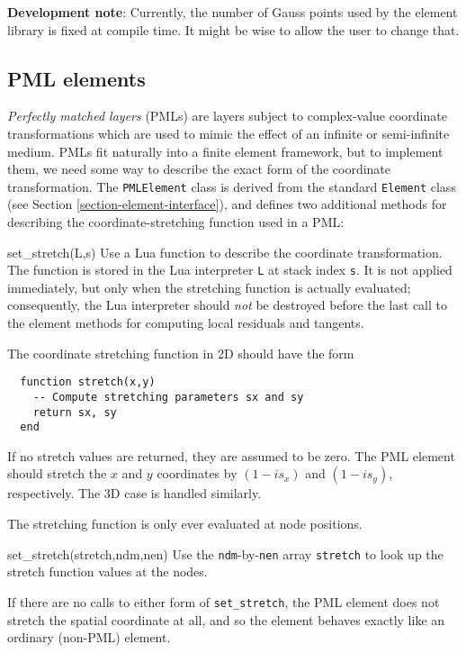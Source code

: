 \documentclass{article}
\newcommand{\devnote}[1]{%
  \begin{trivlist}
  \item\textbf{Development note}: #1
  \end{trivlist}}
\newenvironment{codelist}[1][\quad]%
  {\begin{list}{}{%
   \settowidth{\labelwidth}{\texttt{#1}\hfil}%
   \setlength{\leftmargin}{\labelwidth}%
   \addtolength{\leftmargin}{\labelsep}%
   \addtolength{\leftmargin}{\parindent}%
   \renewcommand{\makelabel}[1]{\texttt{##1}}}}%
  {\end{list}}
\newcommand{\ttt}[1]{\texttt{#1}}
\begin{document}
\devnote{Currently, the number of Gauss points used by the element
  library is fixed at compile time.  It might be wise to allow the
  user to change that.}


\subsection{PML elements}

\emph{Perfectly matched layers} (PMLs) are layers subject to
complex-value coordinate transformations which are used to mimic the
effect of an infinite or semi-infinite medium.  PMLs fit naturally
into a finite element framework, but to implement them, we need some
way to describe the exact form of the coordinate transformation.
The \ttt{PMLElement} class is derived from the standard
\ttt{Element} class (see Section
\ref{section-element-interface}), and defines two additional methods
for describing the coordinate-stretching function used in a PML:
\begin{codelist}

  \item[set\_stretch(L,s)]
    Use a Lua function to describe the coordinate transformation.  The
    function is stored in the Lua interpreter \ttt{L} at stack
    index \ttt{s}.  It is not applied immediately, but only when
    the stretching function is actually evaluated; consequently, the
    Lua interpreter should \emph{not} be destroyed before the last
    call to the element methods for computing local residuals and
    tangents.

    The coordinate stretching function in 2D should have the form
    \begin{verbatim}
  function stretch(x,y)
    -- Compute stretching parameters sx and sy
    return sx, sy
  end
    \end{verbatim}
    If no stretch values are returned, they are assumed to be zero.
    The PML element should stretch the $x$ and $y$ coordinates by
    $(1-is_x)$ and $(1-is_y)$, respectively.  The 3D case is handled
    similarly.

    The stretching function is only ever evaluated at node positions.

  \item[set\_stretch(stretch,ndm,nen)]
    Use the \ttt{ndm}-by-\ttt{nen} array \ttt{stretch} to
    look up the stretch function values at the nodes.

\end{codelist}
If there are no calls to either form of \ttt{set\_stretch}, the PML
element does not stretch the spatial coordinate at all, and so the
element behaves exactly like an ordinary (non-PML) element.
\end{document}

